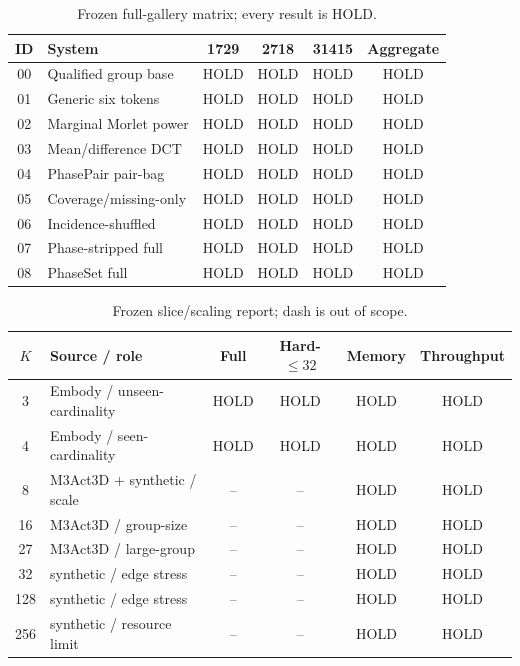 \documentclass{article}
\newcommand{\ResultHold}{\textcolor{holdred}{\textsf{HOLD}}}
\begin{document}
\begin{table}[t]
\centering
\caption{Frozen full-gallery matrix; every result is \ResultHold.}
\label{tab:hold}
\begin{tabular}{@{}c p{49mm} c c c c@{}}
\toprule
ID & System & 1729 & 2718 & 31415 & Aggregate \\
\midrule
00 & Qualified group base       & \ResultHold & \ResultHold & \ResultHold & \ResultHold \\
01 & Generic six tokens         & \ResultHold & \ResultHold & \ResultHold & \ResultHold \\
02 & Marginal Morlet power      & \ResultHold & \ResultHold & \ResultHold & \ResultHold \\
03 & Mean/difference DCT        & \ResultHold & \ResultHold & \ResultHold & \ResultHold \\
04 & PhasePair pair-bag         & \ResultHold & \ResultHold & \ResultHold & \ResultHold \\
05 & Coverage/missing-only      & \ResultHold & \ResultHold & \ResultHold & \ResultHold \\
06 & Incidence-shuffled         & \ResultHold & \ResultHold & \ResultHold & \ResultHold \\
07 & Phase-stripped full        & \ResultHold & \ResultHold & \ResultHold & \ResultHold \\
08 & PhaseSet full              & \ResultHold & \ResultHold & \ResultHold & \ResultHold \\
\bottomrule
\end{tabular}
\end{table}

\begin{table}[t]
\centering
\caption{Frozen slice/scaling report; dash is out of scope.}
\label{tab:scaling}
\begin{tabular}{@{}c p{45mm} c c c c@{}}
\toprule
$K$ & Source / role & Full & Hard-$\leq32$ & Memory & Throughput \\
\midrule
3   & Embody / unseen-cardinality & \ResultHold & \ResultHold & \ResultHold & \ResultHold \\
4   & Embody / seen-cardinality   & \ResultHold & \ResultHold & \ResultHold & \ResultHold \\
8   & M3Act3D + synthetic / scale & -- & -- & \ResultHold & \ResultHold \\
16  & M3Act3D / group-size        & -- & -- & \ResultHold & \ResultHold \\
27  & M3Act3D / large-group       & -- & -- & \ResultHold & \ResultHold \\
32  & synthetic / edge stress     & -- & -- & \ResultHold & \ResultHold \\
128 & synthetic / edge stress     & -- & -- & \ResultHold & \ResultHold \\
256 & synthetic / resource limit  & -- & -- & \ResultHold & \ResultHold \\
\bottomrule
\end{tabular}
\end{table}
\end{document}
